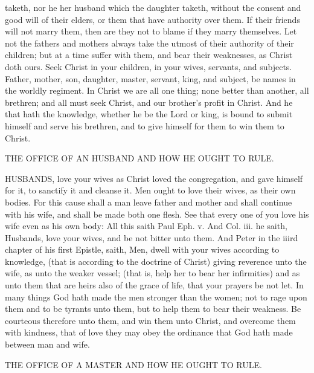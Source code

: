 taketh, nor he her husband which the daughter taketh, 
without the consent and good will of their elders, or them 
that have authority over them. If their friends will not 
marry them, then are they not to blame if they marry 
themselves. Let not the fathers and mothers always take 
the utmost of their authority of their children; but at a 
time suffer with them, and bear their weaknesses, as Christ 
doth ours. Seek Christ in your children, in your wives, 
servants, and subjects. Father, mother, son, daughter, 
master, servant, king, and subject, be names in the worldly 
regiment. In Christ we are all one thing; none better 
than another, all brethren; and all must seek Christ, and 
our brother's profit in Christ. And he that hath the 
knowledge, whether he be the Lord or king, is bound to 
submit himself and serve his brethren, and to give himself 
for them to win them to Christ. 


THE OFFICE OF AN HUSBAND AND HOW HE 
OUGHT TO RULE. 

HUSBANDS, love your wives as Christ loved the congregation,
and gave himself for it, to sanctify it and 
cleanse it. Men ought to love their wives, as their own 
bodies. For this cause shall a man leave father and mother 
and shall continue with his wife, and shall be made both 
one flesh. See that every one of you love his wife even as 
his own body: All this saith Paul Eph. v. And Col. iii. 
he saith, Husbands, love your wives, and be not bitter unto 
them. And Peter in the iiird chapter of his first Epistle, 
saith, Men, dwell with your wives according to knowledge, 
(that is according to the doctrine of Christ) giving reverence
unto the wife, as unto the weaker vessel; (that is, 
help her to bear her infirmities) and as unto them that are 
heirs also of the grace of life, that your prayers be not let. 
In many things God hath made the men stronger than the 
women; not to rage upon them and to be tyrants unto them, 
but to help them to bear their weakness. Be courteous
therefore unto them, and win them unto Christ, and 
overcome them with kindness, that of love they may obey 
the ordinance that God hath made between man and wife. 


THE OFFICE OF A MASTER AND HOW HE 
OUGHT TO RULE.

